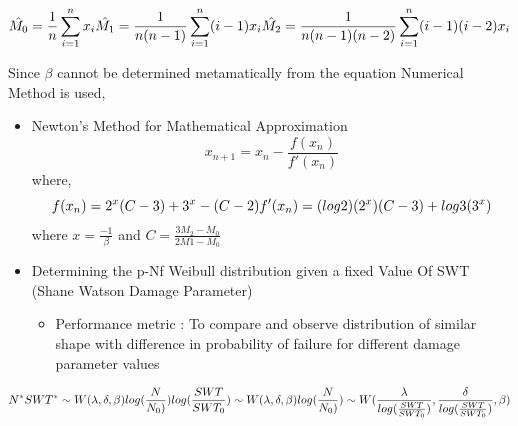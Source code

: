 \documentclass[11pt]{article}
\providecommand{\tightlist}{%
      \setlength{\itemsep}{0pt}\setlength{\parskip}{0pt}}
\begin{document}
\[
\hat{M_0} = \frac{1}{n}\sum_{i=1}^n x_i \\
\hat{M_1} = \frac{1}{n(n-1)}\sum_{i=1}^n (i - 1)x_i \\
\hat{M_2} = \frac{1}{n(n-1)(n-2)}\sum_{i=1}^n (i - 1)(i - 2)x_i \\
\]

Since \(\beta\) cannot be determined metamatically from the equation
Numerical Method is used,

\begin{itemize}
\item
  Newton's Method for Mathematical Approximation \[
  x_{n+1} = x_n - \frac{f(x_n)}{f'(x_n)}
  \] where, \[
  f(x_n) = 2^{x}(C-3) + 3^{x} - (C-2) \\
  f'(x_n) = (log2)(2^x)(C-3) + log3(3^x) \\
  \] where \(x = \frac{-1}{\beta}\) and
  \(C = \frac{3M_2 - M_0}{2M1 - M_0}\)
\item
  Determining the p-Nf Weibull distribution given a fixed Value Of SWT
  (Shane Watson Damage Parameter)

  \begin{itemize}
  \tightlist
  \item
    Performance metric : To compare and observe distribution of similar
    shape with difference in probability of failure for different damage
    parameter values
  \end{itemize}
\end{itemize}

\[
N^*SWT^* \sim W(\lambda,\delta,\beta) \\
log(\frac{N}{N_0)})log(\frac{SWT}{SWT_0}) \sim W(\lambda,\delta,\beta) \\
log(\frac{N}{N_0)})\sim W(\frac{\lambda}{log(\frac{SWT}{SWT_0}) },\frac{\delta}{log(\frac{SWT}{SWT_0}) },\beta) \\
\]
\end{document}
